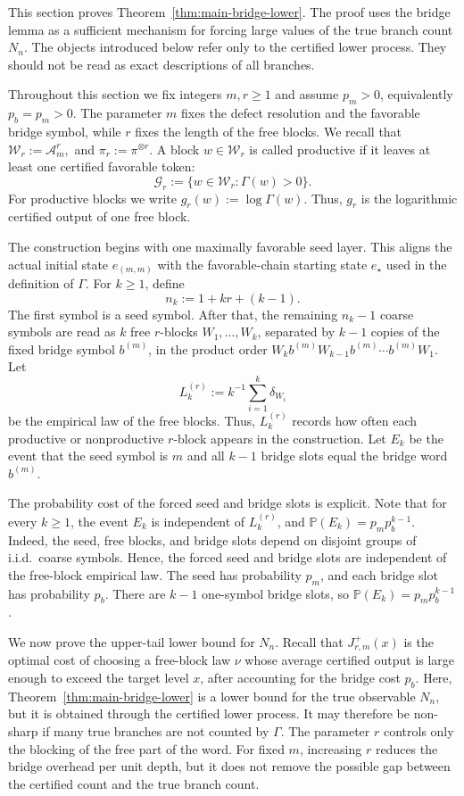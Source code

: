 \documentclass[11pt]{amsart}
\numberwithin{equation}{section}
\theoremstyle{plain}
\theoremstyle{definition}
\theoremstyle{remark}
\begin{document}
This section proves Theorem~\ref{thm:main-bridge-lower}. The proof uses the bridge lemma as a sufficient mechanism for forcing large values of the true branch count \(N_n\). The objects introduced below refer only to the certified lower process. They should not be read as exact descriptions of all branches.

Throughout this section we fix integers \(m,r\ge1\) and assume \(p_m>0\), equivalently \(p_b=p_m>0\). The parameter \(m\) fixes the defect resolution and the favorable bridge symbol, while \(r\) fixes the length of the free blocks.
We recall that
\(
\mathcal W_r:=\mathcal A_m^r,
\)
and
\(
\pi_r:=\pi^{\otimes r}.
\)
A block \(w\in\mathcal W_r\) is called productive if it leaves at least one certified favorable token:
\[
\mathcal G_r:=\{w\in\mathcal W_r:\Gamma(w)>0\}.
\]
For productive blocks we write \(g_r(w):=\log\Gamma(w)\). Thus, \(g_r\) is the logarithmic certified output of one free block.


The construction begins with one maximally favorable seed layer. This aligns the actual initial state \(e_{(m,m)}\) with the favorable-chain starting state \(e_\star\) used in the definition of \(\Gamma\).
For \(k\ge1\), define
\[
n_k:=1+kr+(k-1).
\]
The first symbol is a seed symbol. After that, the remaining \(n_k-1\)
coarse symbols are read as \(k\) free \(r\)-blocks
\(W_1,\dots,W_k\), separated by \(k-1\) copies of the fixed bridge
symbol \(b^{(m)}\), in the product order
\(
  W_k b^{(m)} W_{k-1} b^{(m)} \cdots b^{(m)} W_1 .
\)
Let
\[
L_k^{(r)}:=k^{-1}\sum_{i=1}^k\delta_{W_i}
\]
be the empirical law of the free blocks. Thus, \(L_k^{(r)}\) records how often each productive or nonproductive \(r\)-block appears in the construction. Let \(E_k\) be the event that the seed symbol is \(m\) and all \(k-1\) bridge slots equal the bridge word \(b^{(m)}\).

The probability cost of the forced seed and bridge slots is explicit.
Note that
for every \(k\ge1\), the event \(E_k\) is independent of \(L_k^{(r)}\), and
\(
\mathbb P(E_k)=p_mp_b^{k-1}.
\)
Indeed, 
the seed, free blocks, and bridge slots depend on disjoint groups of i.i.d.\ coarse symbols. Hence, the forced seed and bridge slots are independent of the free-block empirical law. The seed has probability \(p_m\), and each bridge slot has probability \(p_b\). There are \(k-1\) one-symbol bridge slots, so \(\mathbb P(E_k)=p_mp_b^{k-1}\).


We now prove the upper-tail lower bound for \(N_n\). Recall that \(J_{r,m}^{+}(x)\) is the optimal cost of choosing a free-block law \(\nu\) whose average certified output is large enough to exceed the target level \(x\), after accounting for the bridge cost \(p_b\). 
Here, Theorem~\ref{thm:main-bridge-lower} is a lower bound for the true observable \(N_n\), but it is obtained through the certified lower process. It may therefore be non-sharp if many true branches are not counted by \(\Gamma\).
The parameter \(r\) controls only the blocking of the free part of the word. For fixed \(m\), increasing \(r\) reduces the bridge overhead per unit depth, but it does not remove the possible gap between the certified count and the true branch count.
\end{document}
